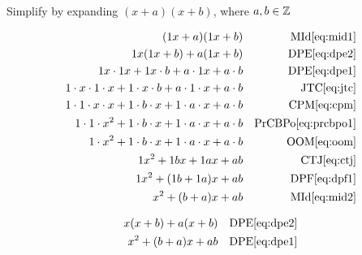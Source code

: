 \begin{example}[id:20141109-133316] \label{20141109-133316}  \hfill \\

Simplify by expanding $(x+a)(x+b)$, where $ a, b \in \mathbb{Z}$

\soln

\solnsteps
\begin{align*}
(1x+a)(1x+b)  && \text{MId} \eqref{eq:mid1} \\
1x(1x+b) + a(1x+b)  && \text{DPE} \eqref{eq:dpe2} \\
1x \cdot 1x + 1x \cdot b + a \cdot 1x + a \cdot b  && \text{DPE} \eqref{eq:dpe1} \\ 
1 \cdot x \cdot 1 \cdot x + 1 \cdot x \cdot b + a \cdot 1 \cdot x + a \cdot b  && \text{JTC} \eqref{eq:jtc} \\
1 \cdot 1 \cdot x \cdot x + 1 \cdot b \cdot x + 1 \cdot a \cdot x + a \cdot b  && \text{CPM} \eqref{eq:cpm} \\
1 \cdot 1 \cdot x^2 + 1 \cdot b \cdot x + 1 \cdot a \cdot x + a \cdot b  && \text{PrCBPo} \eqref{eq:prcbpo1} \\
1 \cdot x^2 + 1 \cdot b \cdot x + 1 \cdot a \cdot x + a \cdot b  && \text{OOM} \eqref{eq:oom} \\
1 x^2 + 1 b x + 1 a x + a b  && \text{CTJ} \eqref{eq:ctj} \\
1 x^2 + (1b + 1a)x + ab && \text{DPF} \eqref{eq:dpf1} \\
x^2+(b+a)x+ab  && \text{MId} \eqref{eq:mid2} 
\end{align*}

\soln

\lesssteps
\begin{align*}
x(x+b)+a(x+b) && \text{DPE} \eqref{eq:dpe2} \\ 
x^2 + (b+a)x + ab && \text{DPE} \eqref{eq:dpe1} 
\end{align*}

\end{example}

